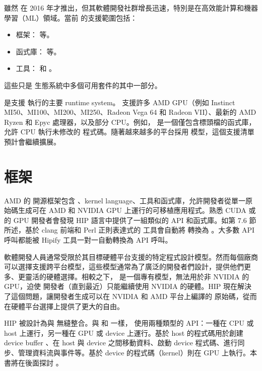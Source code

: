 雖然  在 2016 年才推出，但其軟體開發社群增長迅速，特別是在高效能計算和機器學習（ML）領域。當前  的支援範圍包括：

\begin{itemize}
    \item 框架： 等。
    \item 函式庫：
     等。
    \item 工具： 和 。
\end{itemize}

這些只是  生態系統中多個可用套件的其中一部分。

 是支援  執行的主要 runtime system。 支援許多 AMD GPU（例如 Instinct MI50、MI100、MI200、MI250、Radeon Vega 64 和 Radeon VII）、最新的 AMD Ryzen 和 Epyc 處理器，以及部分 CPU。例如， 是一個僅包含標頭檔的函式庫，允許 CPU 執行未修改的  程式碼。隨著越來越多的平台採用  模型，這個支援清單預計會繼續擴展。

\section{ 框架}
AMD 的  開源框架包含 、kernel language、工具和函式庫，允許開發者從單一原始碼生成可在 AMD 和 NVIDIA GPU 上運行的可移植應用程式。熟悉 CUDA 或  的 GPU 開發者會發現 HIP 語言中提供了一組類似的 API 和函式庫。如第 7.6 節所述，基於 clang 前端和 Perl 正則表達式的  工具會自動將  轉換為 。大多數  API 呼叫都能被 Hipify 工具一對一自動轉換為  API 呼叫。

軟體開發人員通常受限於其目標硬體平台支援的特定程式設計模型。然而每個廠商可以選擇支援跨平台模型，這些模型通常為了廣泛的開發者們設計，提供他們更多、更靈活的硬體選擇。相較之下， 是一個專有模型，無法用於非 NVIDIA 的 GPU，迫使  開發者（直到最近）只能繼續使用 NVIDIA 的硬體。HIP 現在解決了這個問題，讓開發者生成可以在 NVIDIA 和 AMD 平台上編譯的  原始碼，從而在硬體平台選擇上提供了更大的自由。

HIP 被設計為與 無縫整合。與  和  一樣， 使用兩種類型的 API：一種在 CPU 或 host 上運行，另一種在 GPU 或 device 上運行。基於 host 的程式碼用於創建 device buffer 、在 host 與 device 之間移動資料、啟動 device 程式碼、進行同步、管理資料流與事件等。基於 device 的程式碼（kernel）則在 GPU 上執行。本書將在後面探討 。

